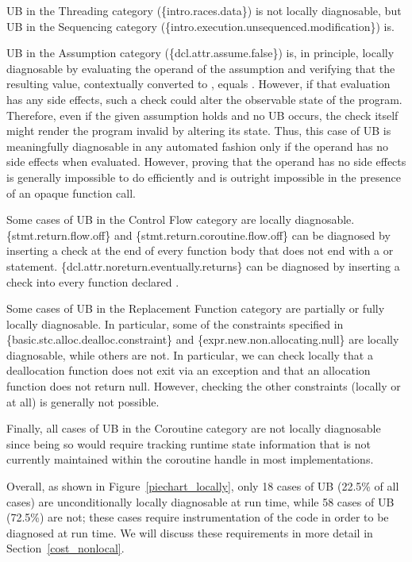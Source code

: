 UB in the Threading category (\{intro.races.data\}) is not locally diagnosable, but UB in the Sequencing category (\{intro.execution.unsequenced.modification\}) is. 

UB in the Assumption category (\{dcl.attr.assume.false\}) is, in principle, locally diagnosable by evaluating the operand of the assumption and verifying that the resulting value, contextually converted to , equals . However, if that evaluation has any side effects, such a check could alter the observable state of the program. Therefore, even if the given assumption holds and no UB occurs, the check itself might render the program invalid by altering its state. Thus, this case of UB is  meaningfully diagnosable in any automated fashion only if the operand has no side effects when evaluated. However, proving that the operand has no side effects is generally impossible to do efficiently and is outright impossible in the presence of an opaque function call.

Some cases of UB in the Control Flow category are locally diagnosable. \{stmt.return.flow.off\} and \{stmt.return.coroutine.flow.off\} can be diagnosed by inserting a check at the end of every function body that does not end with a  or  statement. \{dcl.attr.noreturn.eventually.returns\} can be diagnosed by inserting a check into every function declared \tcode{[[noreturn]]}.

Some cases of UB in the Replacement Function category are partially or fully locally diagnosable. In particular, some of the constraints specified in \{basic.stc.alloc.dealloc.constraint\} and \{expr.new.non.allocating.null\} are locally diagnosable, while others are not. In particular, we can check locally that a deallocation function does not exit via an exception and that an allocation function does not return null. However, checking the other constraints (locally or at all) is generally not possible.

Finally, all cases of UB in the Coroutine category are not locally diagnosable since being so would require tracking runtime state information that is not currently maintained within the coroutine handle in most implementations.

Overall, as shown in Figure~\ref{piechart_locally}, only 18 cases of UB (22.5\% of all cases) are unconditionally locally diagnosable at run time, while 58 cases of UB (72.5\%) are not; these cases require instrumentation of the code in order to be diagnosed at run time. We will discuss these requirements in more detail in Section~\ref{cost_nonlocal}.

